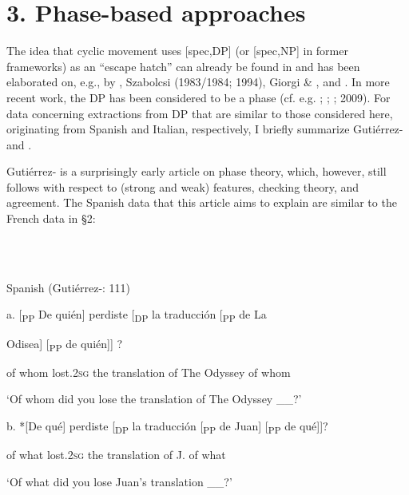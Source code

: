 \documentclass[output=paper]{langsci/langscibook}
\begin{document}
\section{ 3. Phase-based approaches}

The idea that cyclic movement uses [spec,DP] (or [spec,NP] in former frameworks) as an “escape hatch” can already be found in \citet{Cinque1980} and has been elaborated on, e.g., by \citet{Stowell1989}, Szabolcsi (1983/1984; 1994), Giorgi \& \citet{Longobardi1991}, and \citet{Gavruseva2000}. In more recent work, the DP has been considered to be a phase (cf. e.g. \citealt{Svenonius2004}; \citealt{Chomsky2008}; \citealt{Heck2008}; 2009). For data concerning extractions from DP that are similar to those considered here, originating from Spanish and Italian, respectively, I briefly summarize Gutiérrez-\citet{Bravo2001} and \citet{Cinque2014}.

  Gutiérrez-\citet{Bravo2001} is a surprisingly early article on phase theory, which, however, still follows \citet{Chomsky1995} with respect to (strong and weak) features, checking theory, and agreement. The Spanish data that this article aims to explain are similar to the French data in §2:

\ea%
    \label{ex:key:17}
    \gll\\
        \\
    \glt
    \z

           Spanish (Gutiérrez-\citealt{Bravo2001}: 111)

a.  [\textsubscript{PP} De  quién]  perdiste  [\textsubscript{DP}  la  traducción [\textsubscript{PP}  de  La    

Odisea] [\textsubscript{PP}  de  quién]] ?

          of  whom  lost.\textsc{2sg}    the  translation    of  The        Odyssey  of  whom

    ‘Of whom did you lose the translation of The Odyssey \_\_?’

b.  *[De qué] perdiste [\textsubscript{DP}  la  traducción [\textsubscript{PP}  de Juan] [\textsubscript{PP}  de qué]]?

       of what   lost.\textsc{2sg}    the   translation    of J.    of what

    ‘Of what did you lose Juan’s translation \_\_?’
\end{document}
